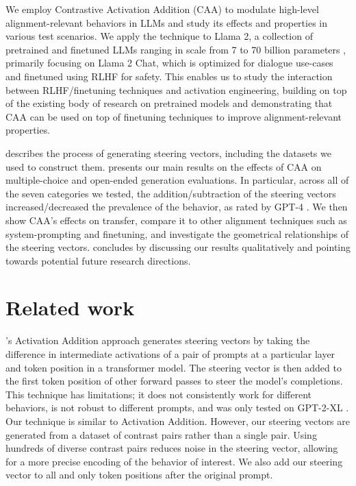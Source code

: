 \documentclass[11pt]{article}
\begin{document}
We employ Contrastive Activation Addition (CAA) to modulate high-level alignment-relevant behaviors in LLMs and study its effects and properties in various test scenarios. We apply the technique to Llama 2, a collection of pretrained and finetuned LLMs ranging in scale from 7 to 70 billion parameters \citep{touvron2023llama}, primarily focusing on Llama 2 Chat, which is optimized for dialogue use-cases and finetuned using RLHF for safety. This enables us to study the interaction between RLHF/finetuning techniques and activation engineering, building on top of the existing body of research on pretrained models and demonstrating that CAA can be used on top of finetuning techniques to improve alignment-relevant properties.

 describes the process of generating steering vectors, including the datasets we used to construct them.  presents our main results on the effects of CAA on multiple-choice and open-ended generation evaluations. In particular, across all of the seven categories we tested, the addition/subtraction of the steering vectors increased/decreased the prevalence of the behavior, as rated by GPT-4 \cite{openai2023gpt4}. We then show CAA's effects on transfer, compare it to other alignment techniques such as system-prompting and finetuning, and investigate the geometrical relationships of the steering vectors.  concludes by discussing our results qualitatively and pointing towards potential future research directions.

\section{Related work}

\citet{turner2023activation}'s Activation Addition approach generates steering vectors by taking the difference in intermediate activations of a pair of prompts at a particular layer and token position in a transformer model. The steering vector is then added to the first token position of other forward passes to steer the model's completions. This technique has limitations; it does not consistently work for different behaviors, is not robust to different prompts, and was only tested on GPT-2-XL \citep{gpt2}. Our technique is similar to Activation Addition. However, our steering vectors are generated from a dataset of contrast pairs rather than a single pair. Using hundreds of diverse contrast pairs reduces noise in the steering vector, allowing for a more precise encoding of the behavior of interest. We also add our steering vector to all and only token positions after the original prompt.
\end{document}
